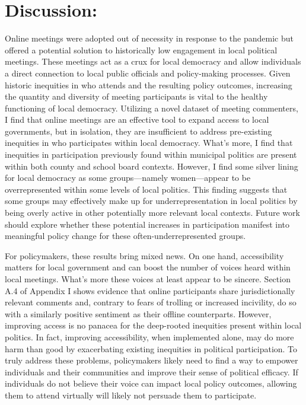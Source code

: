 \section{Discussion:}
Online meetings were adopted out of necessity in response to the pandemic but offered a potential solution to historically low engagement in local political meetings. These meetings act as a crux for local democracy and allow individuals a direct connection to local public officials and policy-making processes. Given historic inequities in who attends and the resulting policy outcomes, increasing the quantity and diversity of meeting participants is vital to the healthy functioning of local democracy. Utilizing a novel dataset of meeting commenters, I find that online meetings are an effective tool to expand access to local governments, but in isolation, they are insufficient to address pre-existing inequities in who participates within local democracy. What’s more, I find that inequities in participation previously found within municipal politics are present within both county and school board contexts. However, I find some silver lining for local democracy as some groups—namely women—appear to be overrepresented within some levels of local politics. This finding suggests that some groups may effectively make up for underrepresentation in local politics by being overly active in other potentially more relevant local contexts. Future work should explore whether these potential increases in participation manifest into meaningful policy change for these often-underrepresented groups.

For policymakers, these results bring mixed news. On one hand, accessibility matters for local government and can boost the number of voices heard within local meetings. What’s more these voices at least appear to be sincere. Section A.4 of Appendix I shows evidence that online participants share jurisdictionally relevant comments and, contrary to fears of trolling or increased incivility, do so with a similarly positive sentiment as their offline counterparts. However, improving access is no panacea for the deep-rooted inequities present within local politics. In fact, improving accessibility, when implemented alone, may do more harm than good by exacerbating existing inequities in political participation. To truly address these problems, policymakers likely need to find a way to empower individuals and their communities and improve their sense of political efficacy. If individuals do not believe their voice can impact local policy outcomes, allowing them to attend virtually will likely not persuade them to participate. 
